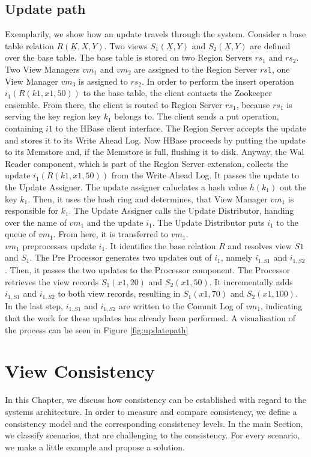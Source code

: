 \documentclass[11pt,a4paper,bibtotoc,idxtotoc,headsepline,footsepline,footexclude,BCOR12mm,DIV13]{scrbook}
\begin{document}
\section{Update path}
Exemplarily, we show how an update travels through the system. Consider a base table relation $R(\underline{K},X,Y)$. Two views $S_1(\underline{X},Y)$ and $S_2(\underline{X},Y)$ are defined over the base table. The base table is stored on two Region Servers $rs_1$ and $rs_2$. Two View Managers $vm_1$ and $vm_2$  are assigned to the Region Server $rs1$, one View Manager $vm_3$ is assigned to $rs_2$. In order to perform the insert operation $i_1(R(k1,x1,50))$ to the base table, the client contacts the Zookeeper ensemble. From there, the client is routed to Region Server $rs_1$, because $rs_1$ is serving the key region key $k_1$ belongs to. The client sends a put operation, containing $i1$ to the HBase client interface. The Region Server accepts the update and stores it to its Write Ahead Log. Now HBase proceeds by putting the update to its Memstore and, if the Memstore is full, flushing it to disk. Anyway, the Wal Reader component, which is part of the Region Server extension, collects the update $i_1(R(k1,x1,50))$ from the Write Ahead Log. It passes the update to the Update Assigner.  The update assigner caluclates a hash value $h(k_1)$ out the key $k_1$. Then, it uses the hash ring and determines, that View Manager $vm_1$ is responsible for $k_1$. The Update Assigner calls the Update Distributor, handing over the name of $vm_1$ and the update $i_1$. The Update Distributor puts $i_1$ to the queue of $vm_1$. From here, it is transferred to $vm_1$.\\
$vm_1$ preprocesses update $i_1$. It identifies the base relation $R$ and resolves view $S1$ and $S_1$. The Pre Processor generates two updates out of $i_1$, namely $i_{1,S1}$ and $i_{1,S2}$. Then, it passes the two updates to the Processor component. The Processor  retrieves the view records $S_1(x1, 20)$ and  $S_2(x1, 50)$. It incrementally adds $i_{1,S1}$ and $i_{1,S2}$ to both view records, resulting in $S_1(x1, 70)$ and  $S_2(x1, 100)$. In the last step, $i_{1,S1}$ and $i_{1,S2}$ are written to the Commit Log of $vm_1$, indicating that the work for these updates has already been performed. A visualisation of the process can be seen in Figure \ref{fig:updatepath}  



\chapter{View Consistency}
\label{chap:viewconsistency}
In this Chapter, we discuss how consistency can be established with regard to the systems architecture. In order to measure and compare consistency, we define a consistency model and the corresponding consistency levels. In the main Section, we classify scenarios, that are challenging to the consistency. For every scenario, we make a little example and propose a solution. 
\end{document}
